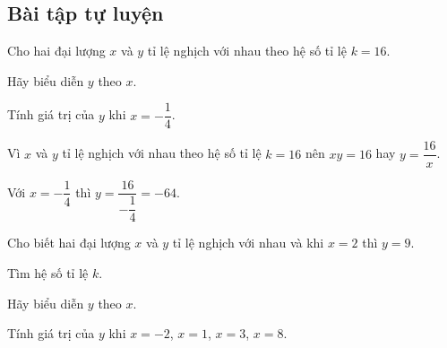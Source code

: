 \subsection{Bài tập tự luyện}

\begin{bt}%
 Cho hai đại lượng $x$ và $y$ tỉ lệ nghịch với nhau theo hệ số tỉ lệ $k=16$.
 \begin{enumEX}{2}
  \item Hãy biểu diễn $y$ theo $x$.
  \item Tính giá trị của $y$ khi $x=-\dfrac{1}{4}$.
 \end{enumEX}
 \loigiai
  {
  \begin{listEX}
   \item Vì $x$ và $y$ tỉ lệ nghịch với nhau theo hệ số tỉ lệ $k=16$ nên $xy=16$ hay $y=\dfrac{16}{x}$.
   \item Với $x=-\dfrac{1}{4}$ thì $y=\dfrac{16}{-\dfrac{1}{4}} = -64$.
  \end{listEX}
  }
\end{bt}

\begin{bt}%
 Cho biết hai đại lượng $x$ và $y$ tỉ lệ nghịch với nhau và khi $x=2$ thì $y=9$.
 \begin{listEX}
  \item Tìm hệ số tỉ lệ $k$.
  \item Hãy biểu diễn $y$ theo $x$.
  \item Tính giá trị của $y$ khi $x=-2$, $x=1$, $x=3$, $x=8$.
 \end{listEX}
 \loigiai
  {
  }
\end{bt}

